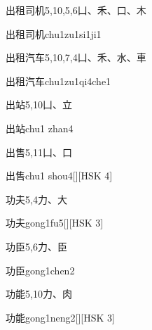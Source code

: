 \begin{entry}{出租司机}{5,10,5,6}{⼐、⽲、⼝、⽊}
  \begin{phonetics}{出租司机}{chu1zu1si1ji1}
  \end{phonetics}
\end{entry}

\begin{entry}{出租汽车}{5,10,7,4}{⼐、⽲、⽔、⾞}
  \begin{phonetics}{出租汽车}{chu1zu1qi4che1}
  \end{phonetics}
\end{entry}

\begin{entry}{出站}{5,10}{⼐、⽴}
  \begin{phonetics}{出站}{chu1 zhan4}
  \end{phonetics}
\end{entry}

\begin{entry}{出售}{5,11}{⼐、⼝}
  \begin{phonetics}{出售}{chu1 shou4}[][HSK 4]
  \end{phonetics}
\end{entry}

\begin{entry}{功夫}{5,4}{⼒、⼤}
  \begin{phonetics}{功夫}{gong1fu5}[][HSK 3]
  \end{phonetics}
\end{entry}

\begin{entry}{功臣}{5,6}{⼒、⾂}
  \begin{phonetics}{功臣}{gong1chen2}
  \end{phonetics}
\end{entry}

\begin{entry}{功能}{5,10}{⼒、⾁}
  \begin{phonetics}{功能}{gong1neng2}[][HSK 3]
  \end{phonetics}
\end{entry}

